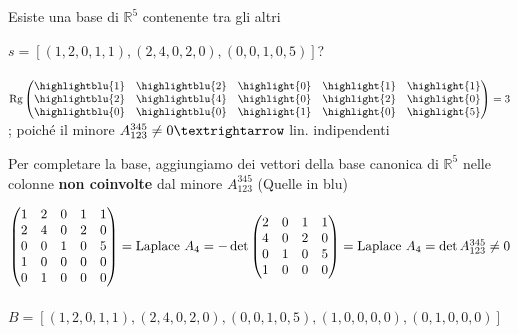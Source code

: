 \begin{esercizio}
	Esiste una base di $\mathbb{R}^5$ contenente tra gli altri
	
	$s=[(1,2,0,1,1),(2,4,0,2,0),(0,0,1,0,5)]$?
	\leavevmode\\\\
	$
	\textnormal{Rg}\begin{pmatrix}
		\highlightblu{1} &\highlightblu{2} &\highlight{0} &\highlight{1} &\highlight{1}\\
		\highlightblu{2} &\highlightblu{4} &\highlight{0} &\highlight{2} &\highlight{0}\\
		\highlightblu{0} &\highlightblu{0} &\highlight{1} &\highlight{0} &\highlight{5}
	\end{pmatrix}=3
	$ ; poiché il minore $A^{345}_{123}\neq 0\textrightarrow$ lin. indipendenti
	
	Per completare la base, aggiungiamo dei vettori della base canonica di $\mathbb{R}^5$ nelle colonne \textbf{non coinvolte} dal minore $A^{345}_{123}$ (Quelle in blu)
	
	$
	\begin{pmatrix}
		1 &2 &0 &1 &1\\
		2 &4 &0 &2 &0\\
		0 &0 &1 &0 &5\\
		1 &0 &0 &0 &0\\
		0 &1 &0 &0 &0
	\end{pmatrix}=\textnormal{Laplace }A_4=-\det\begin{pmatrix}
	2 &0 &1 &1\\
	4 &0 &2 &0\\
	0 &1 &0 &5\\
	1 &0 &0 &0
	\end{pmatrix}=\textnormal{Laplace }A_4=\det A^{345}_{123}\neq 0
	$
	\leavevmode\\\\
	$B=[(1,2,0,1,1),(2,4,0,2,0),(0,0,1,0,5),(1,0,0,0,0),(0,1,0,0,0)]$
\end{esercizio}